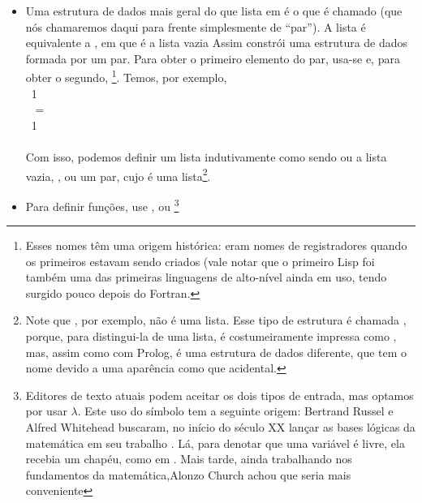 \begin{itemize}
\item Uma estrutura de dados mais geral do que lista em
   é o que é chamado  (que nós
  chamaremos daqui para frente simplesmente de ``par''). A lista
   é equivalente a , em que  é a lista
  vazia
    Assim  constrói uma estrutura de
    dados formada por um par. Para obter o primeiro elemento do par,
    usa-se  e, para obter o segundo,
    \footnote{Esses nomes têm uma origem histórica:
      eram nomes de registradores quando os primeiros
       estavam sendo criados (vale notar que o
      primeiro Lisp foi também uma das primeiras linguagens de
      alto-nível ainda em uso, tendo surgido pouco depois do Fortran.}. Temos, por exemplo,\\
     \seta\ 1\\
     \seta\  =
    \\
     \seta\ 1\\
     \seta\ \\
    Com isso, podemos definir um lista indutivamente como sendo ou a
    lista vazia, , ou um par, cujo
     é uma lista\footnote{Note que ,
      por exemplo, não é uma lista. Esse tipo de estrutura é chamada
      , porque, para distingui-la de uma lista, é
      costumeiramente impressa como , mas, assim como
      com Prolog, é uma estrutura de dados diferente, que tem o nome
       devido a uma aparência como que acidental.}.
\item Para definir funções, use , ou
  \enphasisb{$\lambda$}\footnote{Editores de texto atuais podem aceitar os dois tipos de
    entrada, mas optamos por usar $\lambda$. Este uso do símbolo tem a
    seguinte origem: Bertrand Russel e Alfred Whitehead buscaram, no
    início do século XX lançar as bases lógicas da matemática em seu
    trabalho . Lá, para denotar que uma
    variável é livre, ela recebia um chapéu, como em . Mais tarde, ainda trabalhando nos fundamentos da
    matemática,Alonzo Church achou que seria mais conveniente
}
\end{itemize}
